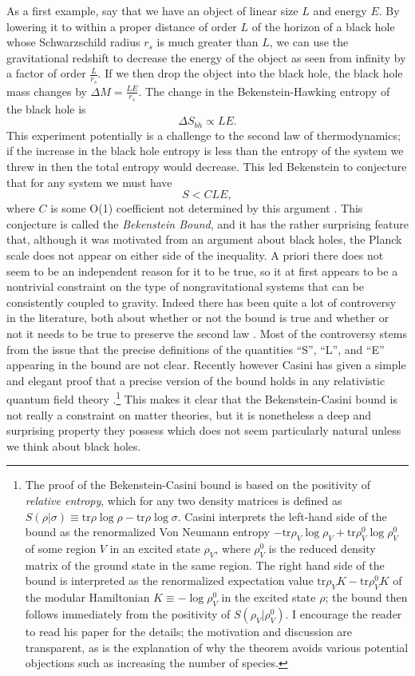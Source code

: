 \documentclass[12pt]{article}
\newcommand{\be}{\begin{equation}}
\newcommand{\ee}{\end{equation}}
\begin{document}
As a first example, say that we have an object of linear size $L$ and energy $E$.  By lowering it to within a proper distance of order $L$ of the horizon of a black hole whose Schwarzschild radius $r_s$ is much greater than $L$, we can use the gravitational redshift to decrease the energy of the object as seen from infinity by a factor of order $\frac{L}{r_s}$.  If we then drop the object into the black hole, the black hole mass changes by $\Delta M=\frac{LE}{r_s}$.  The change in the Bekenstein-Hawking entropy of the black hole is
\be
\Delta S_{bh} \propto LE.
\ee
This experiment potentially is a challenge to the second law of thermodynamics; if the increase in the black hole entropy is less than the entropy of the system we threw in then the total entropy would decrease.  This led Bekenstein to conjecture that for any system we must have
\be\label{bekbound}
S<CLE,
\ee 
where $C$ is some O(1) coefficient not determined by this argument \cite{Bekenstein:1980jp}.  This conjecture is called the \textit{Bekenstein Bound}, and it has the rather surprising feature that, although it was motivated from an argument about black holes, the Planck scale does not appear on either side of the inequality.  A priori there does not seem to be an independent reason  for it to be true, so it at first appears to be a nontrivial constraint on the type of nongravitational systems that can be consistently coupled to gravity.  Indeed there has been quite a lot of controversy in the literature, both about whether or not the bound is true and whether or not it needs to be true to preserve the second law \cite{Unruh:1982ic,Marolf:2003wu,Marolf:2003sq}.  Most of the controversy stems from the issue that the precise definitions of the quantities ``S'', ``L'', and ``E'' appearing in the bound are not clear.  Recently however Casini has given a simple and elegant proof that a precise version of the bound holds in any relativistic quantum field theory \cite{Casini:2008cr}.\footnote{The proof of the Bekenstein-Casini bound is based on the positivity of \textit{relative entropy}, which for any two density matrices is defined as $S(\rho|\sigma)\equiv \mathrm{tr}\rho \log \rho-\mathrm{tr} \rho \log \sigma$.  Casini interprets the left-hand side of the bound as the renormalized Von Neumann entropy $-\mathrm{tr}\rho_V \log \rho_V+\mathrm{tr}\rho_V^0 \log \rho_V^0$ of some region $V$ in an excited state $\rho_V$, where $\rho_V^0$ is the reduced density matrix of the ground state in the same region.  The right hand side of the bound is interpreted as the renormalized expectation value $\mathrm{tr} \rho_V K-\mathrm{tr} \rho_V^0 K$ of the modular Hamiltonian $K\equiv -\log \rho^0_V$ in the excited state $\rho$; the bound then follows immediately from the positivity of $S(\rho_V|\rho_V^0)$.  I encourage the reader to read his paper for the details; the motivation and discussion are transparent, as is the explanation of why the theorem avoids various potential objections such as increasing the number of species.}  This makes it clear that the Bekenstein-Casini bound is not really a constraint on matter theories, but it is nonetheless a deep and surprising property they possess which does not seem particularly natural unless we think about black holes. 
 
\end{document}
